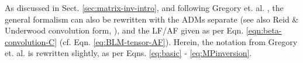 \documentclass[10pt]{article}
\begin{document}












As discussed in Sect. \ref{sec:matrix-inv-intro}, and following Gregory et. al. \cite{gregory2021MolecularFramePhotoelectron}, the general formalism can also be rewritten with the ADMs separate (see also Reid \& Underwood convolution form, \cite{Reid2000}), and the LF/AF given as per Eqn. \ref{eqn:beta-convolution-C} (cf. Eqn. \ref{eq:BLM-tensor-AF}). Herein, the notation from Gregory et. al. \cite{gregory2021MolecularFramePhotoelectron} is rewritten slightly, as per Eqns. \ref{eq:basic} - \ref{eq:MPinversion}.
\end{document}
